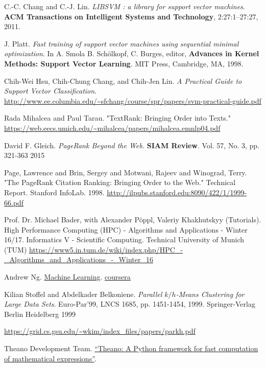 \documentclass[10pt]{amsart}
\begin{document}
\begin{thebibliography}{9}
  C.-C. Chang and C.-J. Lin. \emph{LIBSVM : a library for support vector machines}. \textbf{ACM Transactions on Intelligent Systems and Technology}, 2:27:1--27:27, 2011. 

  J. Platt. \emph{Fast training of support vector machines using sequential minimal optimization}. In A. Smola B. Schölkopf, C. Burges, editor, \textbf{Advances in Kernel Methods: Support Vector Learning}. MIT Press, Cambridge, MA, 1998.

Chih-Wei Hsu, Chih-Chung Chang, and Chih-Jen Lin.  \emph{A Practical Guide to Support Vector Classification}.  \url{http://www.ee.columbia.edu/~sfchang/course/spr/papers/svm-practical-guide.pdf}

Rada Mihalcea and Paul Tarau.  "TextRank: Bringing Order into Texts."  
\url{https://web.eecs.umich.edu/~mihalcea/papers/mihalcea.emnlp04.pdf}  

David F. Gleich.  \emph{PageRank Beyond the Web.}  \textbf{SIAM Review}.  Vol. 57, No. 3, pp. 321-363 2015  
  
Page, Lawrence and Brin, Sergey and Motwani, Rajeev and Winograd, Terry.  "The PageRank Citation Ranking: Bringing Order to the Web." Technical Report. Stanford InfoLab.  1998.  \url{http://ilpubs.stanford.edu:8090/422/1/1999-66.pdf}  
  
Prof. Dr. Michael Bader, with Alexander P\"{o}ppl, Valeriy Khakhutskyy (Tutorials).  High Performance Computing (HPC) - Algorithms and Applications - Winter 16/17.  Informatics V - Scientific Computing.  Technical University of Munich (TUM)
\url{https://www5.in.tum.de/wiki/index.php/HPC_-_Algorithms_and_Applications_-_Winter_16}


Andrew Ng.  \href{https://www.coursera.org/learn/machine-learning/home/welcome}{Machine Learning}.  \href{https://www.coursera.org}{coursera}


Kilian Stoffel and Abdelkader Belkoniene.  \emph{Parallel $k/h$-Means Clustering for Large Data Sets}.  Euro-Par'99, LNCS 1685, pp. 1451-1454, 1999.  Springer-Verlag Berlin Heidelberg 1999

\url{https://grid.cs.gsu.edu/~wkim/index_files/papers/parkh.pdf}

Theano Development Team. \href{http://arxiv.org/pdf/1605.02688.pdf}{“Theano: A Python framework for fast computation of mathematical expressions”}. 


\end{thebibliography}
\end{document}
